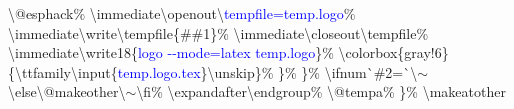 \begin{linenumbers}
\hspace*{3.6em}\textbackslash @esphack\%\newline
\hspace*{3.6em}\textbackslash immediate\textbackslash openout\textbackslash \textcolor{blue}{tempf{}ile=temp.logo}\%\newline
\hspace*{3.6em}\textbackslash immediate\textbackslash write\textbackslash tempf{}ile\{\#\#1\}\%\newline
\hspace*{3.6em}\textbackslash immediate\textbackslash closeout\textbackslash tempf{}ile\%\newline
\hspace*{3.6em}\textbackslash immediate\textbackslash write18\{\textcolor{blue}{logo -{}-mode=latex temp.logo}\}\%\newline
\hspace*{3.6em}\textbackslash colorbox\{gray!6\}\{\textbackslash ttfamily\textbackslash input\{\textcolor{blue}{temp.logo.tex}\}\textbackslash unskip\}\%\newline
\hspace*{2.4em}\}\%\newline
\hspace*{1.2em}\}\%\newline
\hspace*{1.2em}\textbackslash ifnum\`{}\#2=\`{}\textbackslash $\sim$\textbackslash else\textbackslash @makeother\textbackslash $\sim$\textbackslash f{}i\%\newline
\hspace*{1.2em}\textbackslash expandafter\textbackslash endgroup\%\newline
\hspace*{1.2em}\textbackslash @tempa\%\newline
\}\%\newline
\textbackslash makeatother
\end{linenumbers}

